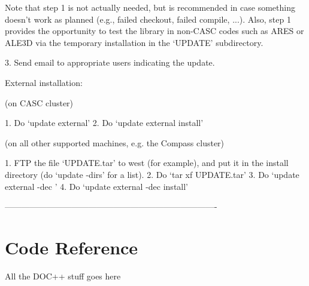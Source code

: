      Note that step 1 is not actually needed, but is recommended in case
     something doesn't work as planned (e.g., failed checkout, failed
     compile, ...).  Also, step 1 provides the opportunity to test the
     library in non-CASC codes such as ARES or ALE3D via the temporary
     installation in the `UPDATE' subdirectory.

  3. Send email to appropriate users indicating the update.

External installation:

  (on CASC cluster)

  1. Do `update external'
  2. Do `update external install'

  (on all other supported machines, e.g. the Compass cluster)

  1. FTP the file `UPDATE.tar' to west (for example), and put it
     in the install directory (do `update -dirs' for a list).
  2. Do `tar xf UPDATE.tar'
  3. Do `update external -dec '
  4. Do `update external -dec install'

----------------------------------------------------------------------------


\section{Code Reference}
All the DOC++ stuff goes here
   

